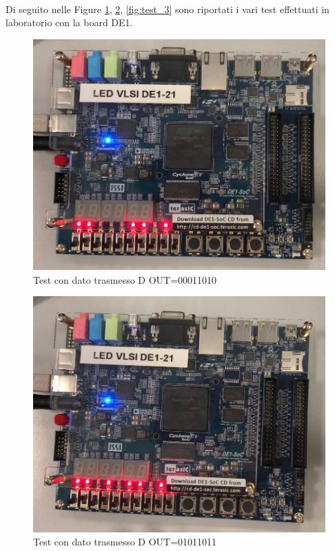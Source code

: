 \documentclass[a4paper, titlepage]{article}
\begin{document}
\\Di seguito nelle Figure \ref{fig:test_1}, \ref{fig:test_2}, \ref{fig:test_3} sono riportati i vari test effettuati in laboratorio con la board DE1.
\begin{figure}[h]
    \centering
    \includegraphics[scale=0.30]{WhatsApp Image 2020-03-12 at 18.31.33.jpeg}
    \caption{Test con dato trasmesso D \textunderscore OUT=00011010}
    \label{fig:test_1}
\end{figure}
\newpage
\begin{figure}[h]
    \centering
    \includegraphics[scale=0.30]{WhatsApp Image 2020-03-12 at 18.31.44.jpeg}
    \caption{Test con dato trasmesso D \textunderscore OUT=01011011}
    \label{fig:test_2}
\end{figure}
\end{document}
